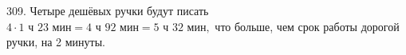 309. Четыре дешёвых ручки будут писать $4\cdot1\text{ ч }23\text{ мин}=4\text{ ч } 92\text{ мин}=5\text{ ч }32\text{ мин},$ что больше, чем срок работы дорогой ручки, на 2 минуты.\\

